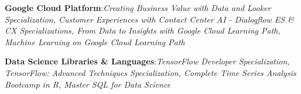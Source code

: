 \documentclass[a4paper,9pt]{extarticle}
\begin{document}
\noindent
\textbf{Google Cloud Platform}:\textit{Creating Business Value with Data and Looker Specialization, Customer Experiences with Contact Center AI - Dialogflow ES \& CX Specializations, From Data to Insights with Google Cloud Learning Path, Machine Learning on Google Cloud Learning Path}

\noindent
\textbf{Data Science Libraries \& Languages}:\textit{TensorFlow Developer Specialization, TensorFlow: Advanced Techniques Specialization, Complete Time Series Analysis Bootcamp in R, Master SQL for Data Science}
\end{document}
